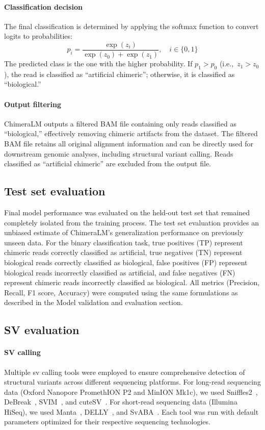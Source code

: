 \documentclass[pdflatex,sn-nature]{sn-jnl}%
\theoremstyle{thmstyleone}%
\theoremstyle{thmstyletwo}%
\theoremstyle{thmstylethree}%
\begin{document}
\paragraph{Classification decision}
The final classification is determined by applying the softmax function to convert logits to probabilities:
$$
	p_i = \frac{\exp(z_i)}{\exp(z_0) + \exp(z_1)}, \quad i \in \{0, 1\}
$$
The predicted class is the one with the higher probability. If $p_1 > p_0$ (i.e.,\ $z_1 > z_0$), the read is classified as ``artificial chimeric''; otherwise, it is classified as ``biological.''

\paragraph{Output filtering}
ChimeraLM outputs a filtered BAM file containing only reads classified as ``biological,'' effectively removing chimeric artifacts from the dataset.
The filtered BAM file retains all original alignment information and can be directly used for downstream genomic analyses, including structural variant calling.
Reads classified as ``artificial chimeric'' are excluded from the output file.

\subsection*{Test set evaluation}

Final model performance was evaluated on the held-out test set that remained completely isolated from the training process.
The test set evaluation provides an unbiased estimate of ChimeraLM's generalization performance on previously unseen data.
For the binary classification task, true positives (TP) represent chimeric reads correctly classified as artificial, true negatives (TN) represent biological reads correctly classified as biological, false positives (FP) represent biological reads incorrectly classified as artificial, and false negatives (FN) represent chimeric reads incorrectly classified as biological.
All metrics (Precision, Recall, F1 score, Accuracy) were computed using the same formulations as described in the Model validation and evaluation section.

\subsection*{SV evaluation}

\paragraph{SV calling}
Multiple \gls{sv} calling tools were employed to ensure comprehensive detection of structural variants across different sequencing platforms.
For long-read sequencing data (Oxford Nanopore PromethION P2 and MinION Mk1c), we used Sniffles2~\cite{Sedlazeck2018, Smolka2024}, DeBreak~\cite{chen2023deciphering}, SVIM~\cite{heller2019svim}, and cuteSV~\cite{jiang2020longreadbased}.
For short-read sequencing data (Illumina HiSeq), we used Manta~\cite{chen2016manta}, DELLY~\cite{rausch2012delly}, and SvABA~\cite{wala2018svaba}.
Each tool was run with default parameters optimized for their respective sequencing technologies.
\end{document}
